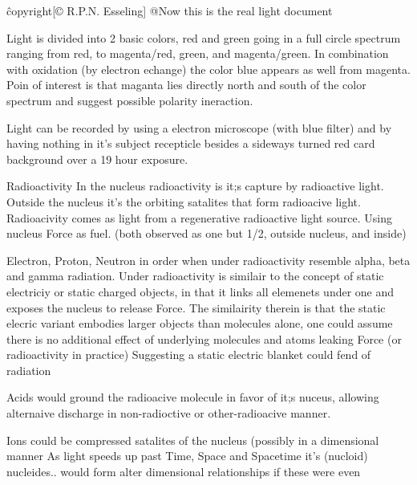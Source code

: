 \^copyright{[© R.P.N. Esseling]}
@Now this is the real light document

Light is divided into 2 basic colors, red and green going in a full circle spectrum ranging from red, to magenta/red, green, and magenta/green.
In combination with oxidation (by electron echange) the color blue appears as well from magenta. 
Poin of interest is that maganta lies directly north and south of the color spectrum and suggest possible polarity ineraction.

Light can be recorded by using a electron microscope (with blue filter) and by having nothing in it's subject recepticle besides a sideways turned red card background over a 19 hour exposure.

Radioactivity
In the nucleus radioactivity is it;s capture by radioactive light.
Outside the nucleus it's the orbiting satalites that form radioacive light. 
Radioacivity comes as light from a regenerative radioactive light source. Using nucleus Force as fuel.
(both observed as one but 1/2, outside nucleus, and inside)

Electron, Proton, Neutron in order when under radioactivity resemble alpha, beta and gamma radiation.
Under radioactivity is similair to the concept of static electriciy or static charged objects, in that it links all elemenets under one and exposes the nucleus to release Force.
The similairity therein is that the static elecric variant embodies larger objects than molecules alone, one could assume there is  no additional effect of underlying molecules and atoms leaking Force (or radioactivity in practice)
Suggesting a static electric blanket could fend of radiation

Acids would ground the radioacive molecule in favor of it;s nuceus, allowing alternaive discharge in non-radioctive or other-radioacive manner.

Ions could be compressed satalites of the nucleus (possibly in a dimensional manner
As light speeds up past Time, Space and Spacetime it's (nucloid) nucleides.. would form alter dimensional relationships if these were even 

